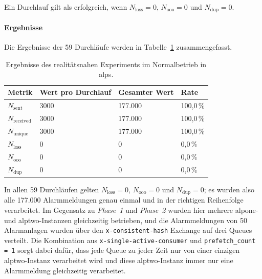Ein Durchlauf gilt als erfolgreich, wenn $N_{\text{loss}} = 0$, $N_{\text{ooo}} = 0$ und $N_{\text{dup}} = 0$.

\paragraph{Ergebnisse} Die Ergebnisse der 59 Durchläufe werden in Tabelle~\ref{tab:exp-alps-normal-results} zusammengefasst.

\begin{table}[H]
    \centering
    \caption{Ergebnisse des realitätsnahen Experiments im Normalbetrieb in \acrshort{alps}.}
    \label{tab:exp-alps-normal-results}
    \begin{tabular}{|l|l|l|l|}
        \hline
        \textbf{Metrik}       & \textbf{Wert pro Durchlauf} & \textbf{Gesamter Wert} & \textbf{Rate} \\
        \hline
        $N_{\text{sent}}$     & 3000                        & 177.000                & 100{,}0\,\%   \\
        $N_{\text{received}}$ & 3000                        & 177.000                & 100{,}0\,\%   \\
        $N_{\text{unique}}$   & 3000                        & 177.000                & 100{,}0\,\%   \\
        $N_{\text{loss}}$     & 0                           & 0                      & 0{,}0\,\%     \\
        $N_{\text{ooo}}$      & 0                           & 0                      & 0{,}0\,\%     \\
        $N_{\text{dup}}$      & 0                           & 0                      & 0{,}0\,\%     \\
        \hline
    \end{tabular}
\end{table}

In allen 59 Durchläufen gelten $N_{\text{loss}} = 0$, $N_{\text{ooo}} = 0$ und $N_{\text{dup}} = 0$; es wurden also alle 177.000 Alarmmeldungen genau einmal und in der richtigen Reihenfolge verarbeitet. Im Gegensatz zu \textit{Phase~1} und \textit{Phase~2} wurden hier mehrere \gls{alpone}- und \gls{alptwo}-Instanzen gleichzeitig betrieben, und die Alarmmeldungen von 50 Alarmanlagen wurden über den \texttt{x-consistent-hash} Exchange auf drei Queues verteilt. Die Kombination aus \texttt{x-single-active-\allowbreak consumer} und \texttt{prefetch\_count = 1} sorgt dabei dafür, dass jede Queue zu jeder Zeit nur von einer einzigen \gls{alptwo}-Instanz verarbeitet wird und diese \gls{alptwo}-Instanz immer nur eine Alarmmeldung gleichzeitig verarbeitet.

